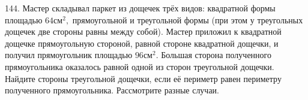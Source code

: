 144. Мастер складывал паркет из дощечек трёх видов: квадратной формы площадью $64\text{см}^2,$ прямоугольной и треугольной формы (при этом у треугольных дощечек две стороны равны между собой). Мастер приложил к квадратной дощечке прямоугольную стороной, равной стороне квадратной дощечки, и получил прямоугольник площадью $96\text{см}^2.$ Большая сторона полученного прямоугольника оказалось равной одной из сторон треугольной дощечки. Найдите стороны треугольной дощечки, если её периметр равен периметру полученного прямоугольника. Рассмотрите разные случаи.\\
